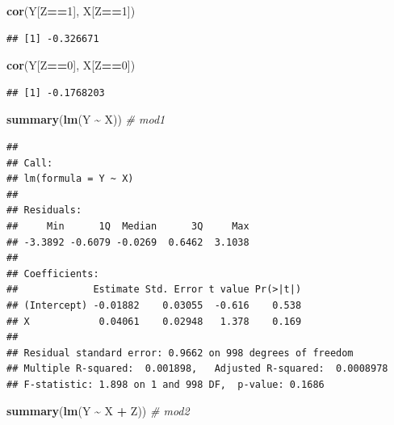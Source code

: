 \documentclass[
]{book}
\newenvironment{Shaded}{\begin{snugshade}}{\end{snugshade}}
\newcommand{\CommentTok}[1]{\textcolor[rgb]{0.56,0.35,0.01}{\textit{#1}}}
\newcommand{\DecValTok}[1]{\textcolor[rgb]{0.00,0.00,0.81}{#1}}
\newcommand{\FunctionTok}[1]{\textcolor[rgb]{0.13,0.29,0.53}{\textbf{#1}}}
\newcommand{\NormalTok}[1]{#1}
\newcommand{\SpecialCharTok}[1]{\textcolor[rgb]{0.81,0.36,0.00}{\textbf{#1}}}
\begin{document}
\begin{Shaded}
\begin{Highlighting}[]
\FunctionTok{cor}\NormalTok{(Y[Z}\SpecialCharTok{==}\DecValTok{1}\NormalTok{], X[Z}\SpecialCharTok{==}\DecValTok{1}\NormalTok{])}
\end{Highlighting}
\end{Shaded}

\begin{verbatim}
## [1] -0.326671
\end{verbatim}

\begin{Shaded}
\begin{Highlighting}[]
\FunctionTok{cor}\NormalTok{(Y[Z}\SpecialCharTok{==}\DecValTok{0}\NormalTok{], X[Z}\SpecialCharTok{==}\DecValTok{0}\NormalTok{])}
\end{Highlighting}
\end{Shaded}

\begin{verbatim}
## [1] -0.1768203
\end{verbatim}

\begin{Shaded}
\begin{Highlighting}[]
\FunctionTok{summary}\NormalTok{(}\FunctionTok{lm}\NormalTok{(Y }\SpecialCharTok{\textasciitilde{}}\NormalTok{ X)) }\CommentTok{\# mod1}
\end{Highlighting}
\end{Shaded}

\begin{verbatim}
## 
## Call:
## lm(formula = Y ~ X)
## 
## Residuals:
##     Min      1Q  Median      3Q     Max 
## -3.3892 -0.6079 -0.0269  0.6462  3.1038 
## 
## Coefficients:
##             Estimate Std. Error t value Pr(>|t|)
## (Intercept) -0.01882    0.03055  -0.616    0.538
## X            0.04061    0.02948   1.378    0.169
## 
## Residual standard error: 0.9662 on 998 degrees of freedom
## Multiple R-squared:  0.001898,   Adjusted R-squared:  0.0008978 
## F-statistic: 1.898 on 1 and 998 DF,  p-value: 0.1686
\end{verbatim}

\begin{Shaded}
\begin{Highlighting}[]
\FunctionTok{summary}\NormalTok{(}\FunctionTok{lm}\NormalTok{(Y }\SpecialCharTok{\textasciitilde{}}\NormalTok{ X }\SpecialCharTok{+}\NormalTok{ Z)) }\CommentTok{\# mod2}
\end{Highlighting}
\end{Shaded}
\end{document}
